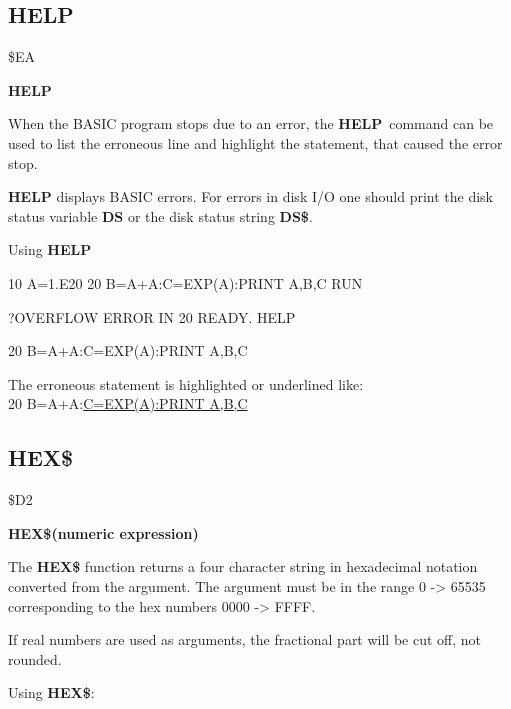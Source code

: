 \subsection{HELP}
\begin{description}[leftmargin=3cm,style=nextline]
\item [Token:] \$EA
\item [Format:] {\bf HELP}
\item [Usage:]
   When the BASIC program stops due to an error,
   the {\bf HELP} command can be used to list the erroneous line
   and highlight the statement, that caused the error stop.

\item [Remarks:]
      {\bf HELP} displays BASIC errors. For errors in disk
      I/O one should print the disk status variable {\bf DS}
      or the disk status string {\bf DS\$}.

\item [Example:] Using {\bf HELP}
\begin{screenoutput}
10 A=1.E20
20 B=A+A:C=EXP(A):PRINT A,B,C
RUN

?OVERFLOW ERROR IN 20
READY.
HELP

20 B=A+A:C=EXP(A):PRINT A,B,C
\end{screenoutput}
The erroneous statement is highlighted or underlined like: \\
20 B=A+A:\underline{C=EXP(A):PRINT A,B,C}
\end{description}


\newpage
\subsection{HEX\$}
\begin{description}[leftmargin=3cm,style=nextline]
\item [Token:] \$D2
\item [Format:] {\bf HEX\$(numeric expression)}
\item [Usage:] The {\bf HEX\$} function returns a four
               character string in hexadecimal notation
               converted from the argument.
               The argument must be in the range 0 -> 65535
               corresponding to the hex numbers 0000 -> FFFF.

\item [Remarks:] If real numbers are used as arguments, the
                 fractional part will be cut off, not rounded.

\item [Example:] Using {\bf HEX\$}:
\end{description}

